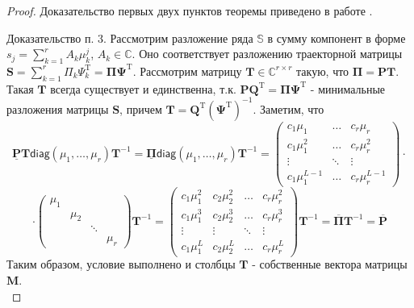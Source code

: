 \documentclass[specialist, substylefile = spbureport.rtx, subf,href,colorlinks=true, 12pt]{disser}
\theoremstyle{definition}
\begin{document}
\begin{proof}
Доказательство первых двух пунктов теоремы приведено в работе \cite{Huffel94}.

Доказательство п. 3. Рассмотрим разложение ряда $\mathbb{S}$ в сумму компонент в форме $s_j = \sum_{k = 1}^{r}A_k\mu_k^j$, $A_k \in \mathbb{C}$. Оно соответствует разложению траекторной матрицы $\mathbf{S} = \sum_{k = 1}^{r}\Pi_k\Psi_k^{\mathrm{T}} = \mathbf{\Pi\Psi}^{\mathrm{T}}$. Рассмотрим матрицу $\mathbf{T} \in \mathbb{C}^{r \times r}$ такую, что $\mathbf{\Pi} = \mathbf{PT}$. Такая $\mathbf{T}$ всегда существует и единственна, т.к. $\mathbf{PQ}^{\mathrm{T}} = \mathbf{\Pi\Psi}^{\mathrm{T}}$ - минимальные разложения матрицы $\mathbf{S}$, причем $\mathbf{T} = \mathbf{Q}^{\mathrm{T}}(\mathbf{\Psi}^{\mathrm{T}})^{-1}$. Заметим, что 
\begin{equation*}
   \underline{\mathbf{P}}\mathbf{T}\mathsf{diag}(\mu_1, \ldots, \mu_r)\mathbf{T}^{-1} = \underline{\mathbf{\Pi}}\mathsf{diag}(\mu_1, \ldots, \mu_r)\mathbf{T}^{-1} = \begin{pmatrix}
        c_1\mu_1& \dots& c_r\mu_r \\
        c_1\mu_1^2& \dots& c_r\mu_r^2 \\
        \vdots& \ddots& \vdots \\
        c_1\mu_1^{L - 1}& \dots& c_r\mu_r^{L - 1}
   \end{pmatrix} \cdot 
\end{equation*}
\begin{equation*}
\cdot
    \begin{pmatrix}
        \mu_1 & & & \\
        & \mu_2 & & \\
        & & \ddots & \\
        & & & \mu_r
    \end{pmatrix}
    \mathbf{T}^{-1} = \begin{pmatrix}
        c_1\mu_1^2 & c_2\mu_2^2 & \dots & c_r\mu_r^2 \\
        c_1\mu_1^3 & c_2\mu_2^3 & \dots & c_r\mu_r^3 \\
        \vdots & \vdots & \ddots & \vdots \\
        c_1\mu_1^L & c_2\mu_2^L & \dots & c_r\mu_r^L
    \end{pmatrix}
    \mathbf{T}^{-1} = \overline{\mathbf{\Pi}}\mathbf{T}^{-1} = \overline{\mathbf{P}}
\end{equation*}
Таким образом, условие выполнено и столбцы $\mathbf{T}$ - собственные вектора матрицы $\mathbf{M}$. \\

\end{proof}
\end{document}
